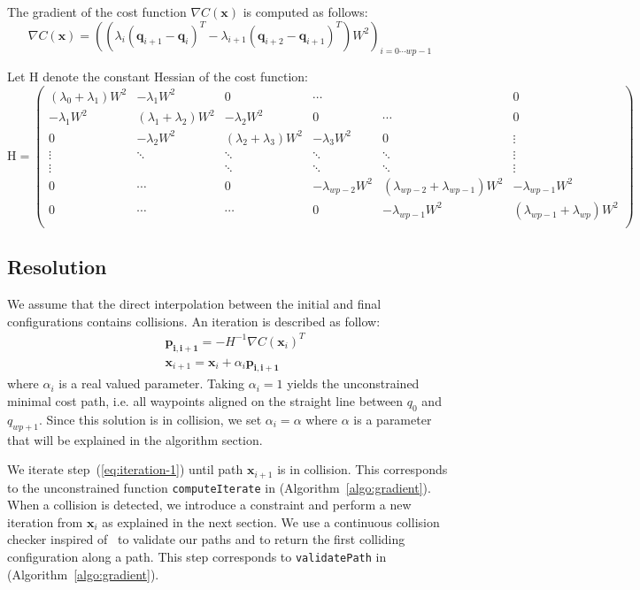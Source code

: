 \documentclass{tADR2e}
\newcommand\pii{\mathbf{p_{i,i+1}}}
\newcommand\conf{\mathbf{q}}
\newcommand\xx{\mathbf{x}} %
\newcommand\cost{C}
\newcommand\weight{W}
\begin{document}
The gradient of the cost function $\nabla \cost (\xx)$ is computed as follows:
$$
\nabla \cost (\xx) = 
\left( (\lambda_{i}(\conf_{i+1} - \conf_{i})^T - \lambda_{i+1}(\conf_{i+2} - \conf_{i+1})^T) \weight^2 \right)_{i=0\cdots wp-1}
$$


Let $\mbox{H}$ denote the constant Hessian of the cost function:
$$
\mbox{H} = \left(\begin{array}{cccccc}
(\lambda_{0}+\lambda_{1})\weight^2 & -\lambda_{1}\weight^2 & 0 & \cdots & & 0 \\
-\lambda_{1}\weight^2 & (\lambda_{1}+\lambda_{2})\weight^2 & -\lambda_{2}\weight^2 & 0 & \cdots & 0 \\
0 & -\lambda_{2}\weight^2 &  (\lambda_{2}+\lambda_{3})\weight^2 & -\lambda_{3}\weight^2 & 0 & \vdots \\
\vdots & \ddots & \ddots & \ddots & \ddots & \vdots\\
\vdots & & \ddots & \ddots & \ddots & \vdots\\
0 & \cdots  & 0 & -\lambda_{wp-2}\weight^2 & (\lambda_{wp-2}+\lambda_{wp-1})\weight^2 & -\lambda_{wp-1}\weight^2 \\
0 & \cdots &  \cdots & 0 & -\lambda_{wp-1}\weight^2 & (\lambda_{wp-1}+\lambda_{wp})\weight^2  \\
\end{array}\right)
$$

\subsection {Resolution}
We assume that the direct interpolation between the initial and final configurations contains collisions. An iteration is described as follow:
\begin{equation}\label{eq:iteration-1}
\begin{split}
& \pii =  -H^{-1} \nabla \cost(\xx_i)^{T} \\
& \xx_{i+1} =  \xx_{i} + \alpha_i \pii
\end{split} 
\end{equation}
where $\alpha_i$ is a real valued parameter. Taking $\alpha_i=1$ yields the 
unconstrained minimal cost path, i.e. all waypoints aligned on the straight line 
between $q_0$ and $q_{wp+1}$. Since this solution is in collision, we set 
$\alpha_i = \alpha$ 
where $\alpha$ is a parameter that will be explained in the algorithm section.

We iterate step~(\ref{eq:iteration-1}) until path $\xx_{i+1}$ is in collision. This 
corresponds to the unconstrained function \texttt{computeIterate} in 
(Algorithm~\ref{algo:gradient}).
When a collision is detected, we introduce a constraint and perform a new 
iteration from $\xx_i$ as explained in the next section. We use a continuous 
collision checker inspired of~\cite{SchwarzerExactCollision} to validate our 
paths and to return the first colliding configuration along a path. This step corresponds to \texttt{validatePath} in (Algorithm~\ref{algo:gradient}).
\end{document}
